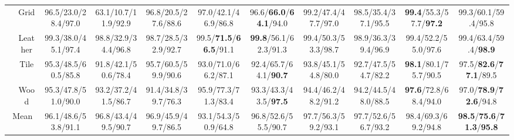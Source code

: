 \documentclass{article}
\theoremstyle{plain}
\theoremstyle{definition}
\theoremstyle{remark}
\begin{document}
\begin{table}[p]
{\begin{tabular}{cccccccccc>{\columncolor{oursblue}}c}
& \cellcolor{rowgray} Grid & \cellcolor{rowgray} 96.5/23.0/28.4/97.0 & \cellcolor{rowgray} 63.1/10.7/11.9/92.9 & \cellcolor{rowgray} 96.8/20.5/27.6/88.6 & \cellcolor{rowgray} 97.0/42.1/46.9/86.8 & \cellcolor{rowgray} 96.6/\textbf{66.0}/\textbf{64.1}/94.0 & \cellcolor{rowgray} 99.2/47.4/47.7/97.0 & \cellcolor{rowgray} 98.5/35.4/37.1/95.5 & \cellcolor{rowgray} \textbf{99.4}/55.3/57.7/\textbf{97.2} & 99.3/60.1/59.4/95.8 \\

& Leather    & 99.3/38.0/45.1/97.4 & 98.8/32.9/34.4/96.8 & 98.7/28.5/32.9/92.7 & 99.5/\textbf{71.5}/\textbf{66.5}/91.1 & \textbf{99.8}/56.1/62.3/91.3 & 99.4/50.3/53.3/98.7 & 98.9/36.3/39.4/96.9 & 99.4/52.2/55.0/97.6 & 99.4/63.4/59.4/\textbf{98.9} \\

& \cellcolor{rowgray} Tile & \cellcolor{rowgray} 95.3/48.5/60.5/85.8 & \cellcolor{rowgray} 91.8/42.1/50.6/78.4 & \cellcolor{rowgray} 95.7/60.5/59.9/90.6 & \cellcolor{rowgray} 93.0/71.0/66.2/87.1 & \cellcolor{rowgray} 92.4/65.7/64.1/\textbf{90.7} & \cellcolor{rowgray} 93.8/45.1/54.8/80.0 & \cellcolor{rowgray} 92.7/47.5/54.7/82.2 & \cellcolor{rowgray} \textbf{98.1}/80.1/75.7/90.5 & 97.5/\textbf{82.6}/\textbf{77.1}/89.5 \\

& Wood       & 95.3/47.8/51.0/90.0 & 93.2/37.2/41.5/86.7 & 91.4/34.8/39.7/76.3 & 95.9/77.3/71.3/83.4 & 93.3/43.3/43.5/\textbf{97.5} & 94.4/46.2/48.2/91.2 & 94.2/44.5/48.0/88.5 & \textbf{97.6}/72.8/68.4/94.0 & 97.0/\textbf{78.9}/\textbf{72.6}/94.8 \\
\midrule
\multicolumn{2}{c}{\cellcolor{rowgray} Mean} & \cellcolor{rowgray} 96.1/48.6/53.8/91.1 & \cellcolor{rowgray} 96.8/43.4/49.5/90.7 & \cellcolor{rowgray} 96.9/45.9/49.7/86.5 & \cellcolor{rowgray} 93.1/54.3/50.9/64.8 & \cellcolor{rowgray} 96.8/52.6/55.5/90.7 & \cellcolor{rowgray} 97.7/56.3/59.2/93.1 & \cellcolor{rowgray} 97.7/52.6/56.7/93.2 & \cellcolor{rowgray} 98.4/69.3/69.2/94.8 & \textbf{98.5}/\textbf{75.6}/\textbf{71.3}/\textbf{95.8} \\
\bottomrule
\end{tabular}
}
\end{table}
\end{document}
